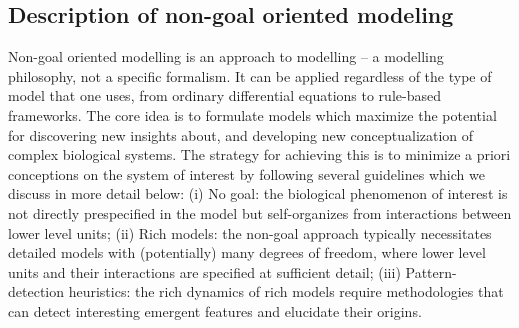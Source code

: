 \subsection{Description of non-goal oriented modeling}

Non-goal oriented modelling is an approach to modelling -- a modelling philosophy, not a specific formalism. It can be applied regardless of the type of model that one uses, from ordinary differential equations to rule-based frameworks. The core idea is to formulate models which maximize the potential for discovering new insights about, and developing new conceptualization of complex biological systems. The strategy for achieving this is to minimize a priori conceptions on the system of interest by following several guidelines which we discuss in more detail below: (i) No goal: the biological phenomenon of interest is not directly prespecified in the model but self-organizes from interactions between lower level units; (ii) Rich models: the non-goal approach typically necessitates detailed models with (potentially) many degrees of freedom, where lower level units and their interactions are specified at sufficient detail; (iii) Pattern-detection heuristics: the rich dynamics of rich models require methodologies that can  detect interesting emergent features and elucidate their origins.

  